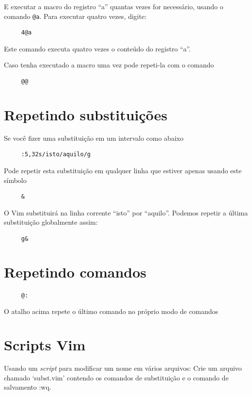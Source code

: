 \documentclass[10pt,a4paper,openany]{book}
\begin{document}
E executar a macro do registro ``a'' quantas vezes for necessário,
usando o comando \verb|@a|. Para executar quatro vezes, digite:

\begin{verbatim}
     4@a
\end{verbatim}

Este comando executa quatro vezes o conteúdo do registro ``a''.

Caso tenha executado a macro uma vez pode repeti-la com o comando

\begin{verbatim}
     @@
\end{verbatim}

\section{Repetindo substituições }
Se você fizer uma substituição em um intervalo como abaixo

\begin{verbatim}
     :5,32s/isto/aquilo/g
\end{verbatim}

Pode repetir esta substituição em qualquer linha que estiver apenas usando este símbolo

\begin{verbatim}
     &
\end{verbatim}

O Vim substituirá na linha corrente ``isto'' por ``aquilo''. Podemos
repetir a última substituição globalmente assim:
   
\begin{verbatim}
     g&
\end{verbatim}

\section{Repetindo comandos}\label{Repetindo comandos}

\begin{verbatim}
     @:
\end{verbatim}

O atalho acima repete o último comando no próprio modo de comandos

\section{Scripts Vim}\label{Scripts Vim}
Usando um {\em script} para modificar um nome em vários arquivos: 
Crie um arquivo chamado `subst.vim' contendo os comandos de substituição e o
comando de salvamento :wq.
\end{document}
